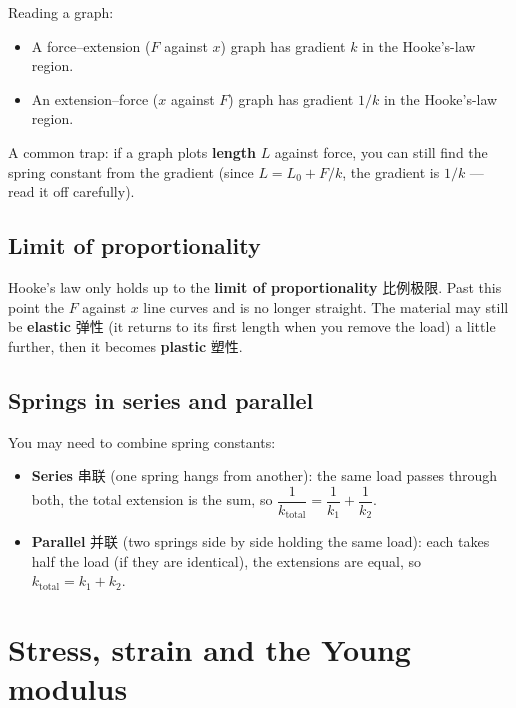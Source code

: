 \documentclass[11pt]{article}
\begin{document}
Reading a graph:

\begin{itemize}
\item A force–extension ($F$ against $x$) graph has gradient $k$ in the Hooke's-law region.

\item An extension–force ($x$ against $F$) graph has gradient $1/k$ in the Hooke's-law region.

\end{itemize}

A common trap: if a graph plots \textbf{length} $L$ against force, you can still find the spring constant from the gradient (since $L = L_{0} + F/k$, the gradient is $1/k$ — read it off carefully).

\subsection*{Limit of proportionality}

Hooke's law only holds up to the \textbf{limit of proportionality} 比例极限. Past this point the $F$ against $x$ line curves and is no longer straight. The material may still be \textbf{elastic} 弹性 (it returns to its first length when you remove the load) a little further, then it becomes \textbf{plastic} 塑性.

\subsection*{Springs in series and parallel}

You may need to combine spring constants:

\begin{itemize}
\item \textbf{Series} 串联 (one spring hangs from another): the same load passes through both, the total extension is the sum, so $\dfrac{1}{k_{\text{total}}} = \dfrac{1}{k_{1}} + \dfrac{1}{k_{2}}$.

\item \textbf{Parallel} 并联 (two springs side by side holding the same load): each takes half the load (if they are identical), the extensions are equal, so $k_{\text{total}} = k_{1} + k_{2}$.

\end{itemize}

\section*{Stress, strain and the Young modulus}
\end{document}
